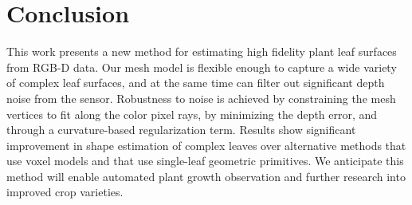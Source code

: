 \section{Conclusion}
\label{sec:conclusion}

This work presents a new method for estimating high fidelity plant leaf surfaces from RGB-D data.  Our mesh model is flexible enough to capture a wide variety of complex leaf surfaces, and at the same time can filter out significant depth noise from the sensor.  Robustness to noise is achieved by constraining the mesh vertices to fit along the color pixel rays, by minimizing the depth error, and through a curvature-based regularization term.  Results show significant improvement in shape estimation of complex leaves over alternative methods that use voxel models and that use single-leaf geometric primitives.  We anticipate this method will enable automated plant growth observation and further research into improved crop varieties.  


